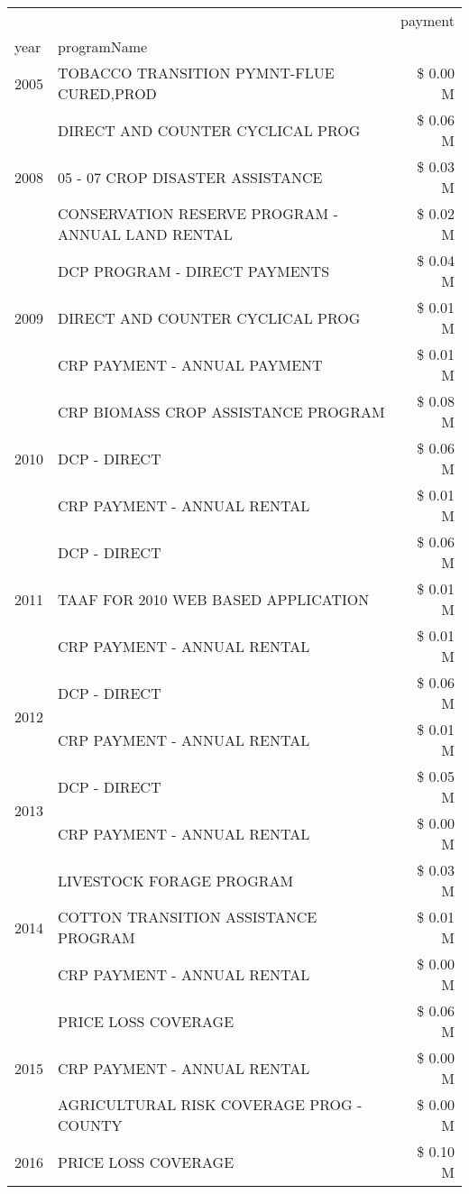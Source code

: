 \begin{tabular}{llr}
\toprule
 &  & payment \\
year & programName &  \\
\midrule
2005 & TOBACCO TRANSITION PYMNT-FLUE CURED,PROD & \$ 0.00 M \\
\cline{1-3}
\multirow[t]{3}{*}{2008} & DIRECT AND COUNTER CYCLICAL PROG & \$ 0.06 M \\
 & 05 - 07 CROP DISASTER ASSISTANCE & \$ 0.03 M \\
 & CONSERVATION RESERVE PROGRAM - ANNUAL LAND RENTAL & \$ 0.02 M \\
\cline{1-3}
\multirow[t]{3}{*}{2009} & DCP PROGRAM - DIRECT PAYMENTS & \$ 0.04 M \\
 & DIRECT AND COUNTER CYCLICAL PROG & \$ 0.01 M \\
 & CRP PAYMENT - ANNUAL PAYMENT & \$ 0.01 M \\
\cline{1-3}
\multirow[t]{3}{*}{2010} & CRP BIOMASS CROP ASSISTANCE PROGRAM & \$ 0.08 M \\
 & DCP - DIRECT & \$ 0.06 M \\
 & CRP PAYMENT - ANNUAL RENTAL & \$ 0.01 M \\
\cline{1-3}
\multirow[t]{3}{*}{2011} & DCP - DIRECT & \$ 0.06 M \\
 & TAAF FOR 2010 WEB BASED APPLICATION & \$ 0.01 M \\
 & CRP PAYMENT - ANNUAL RENTAL & \$ 0.01 M \\
\cline{1-3}
\multirow[t]{2}{*}{2012} & DCP - DIRECT & \$ 0.06 M \\
 & CRP PAYMENT - ANNUAL RENTAL & \$ 0.01 M \\
\cline{1-3}
\multirow[t]{2}{*}{2013} & DCP - DIRECT & \$ 0.05 M \\
 & CRP PAYMENT - ANNUAL RENTAL & \$ 0.00 M \\
\cline{1-3}
\multirow[t]{3}{*}{2014} & LIVESTOCK FORAGE PROGRAM & \$ 0.03 M \\
 & COTTON TRANSITION ASSISTANCE PROGRAM & \$ 0.01 M \\
 & CRP PAYMENT - ANNUAL RENTAL & \$ 0.00 M \\
\cline{1-3}
\multirow[t]{3}{*}{2015} & PRICE LOSS COVERAGE & \$ 0.06 M \\
 & CRP PAYMENT - ANNUAL RENTAL & \$ 0.00 M \\
 & AGRICULTURAL RISK COVERAGE PROG - COUNTY & \$ 0.00 M \\
\cline{1-3}
\multirow[t]{3}{*}{2016} & PRICE LOSS COVERAGE & \$ 0.10 M \\

\end{tabular}
